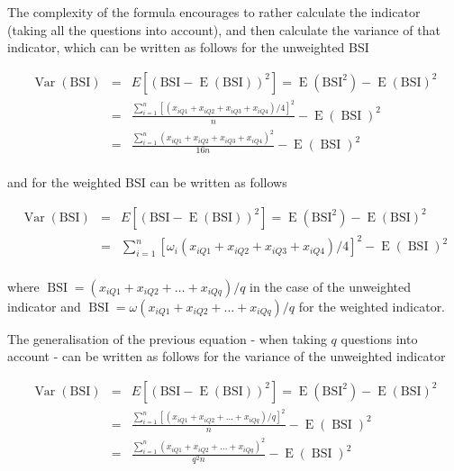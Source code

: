\documentclass[12pt,a4paper,oneside]{book}
\DeclareMathOperator{\Var}{Var}
\DeclareMathOperator{\E}{E}
\DeclareMathOperator{\BSI}{BSI}
\begin{document}
The complexity of the formula encourages to rather calculate the indicator (taking all the questions into account), and then calculate the variance of that indicator, which can be written as follows for the unweighted BSI

\begin{eqnarray}
         \Var(\text{BSI}) &=& E \left[ \left(\text{BSI}-\E(\text{BSI}) \right)^2 \right] =  \E \left( \text{BSI}^2\right) - \E \left( \text{BSI}\right)^2 \\ 
         &=&  \frac{\sum^n_{i=1}[(x_{iQ1} + x_{iQ2} + x_{iQ3} + x_{iQ4})/4]^2}{n} - \E (\BSI)^2 \\
        &=&  \frac{\sum^n_{i=1}(x_{iQ1} + x_{iQ2} + x_{iQ3} + x_{iQ4})^2}{16n} - \E (\BSI)^2 \\ \nonumber
\end{eqnarray}

and for the weighted BSI can be written as follows

\begin{eqnarray}
         \Var(\text{BSI}) &=& E \left[ \left(\text{BSI}-\E(\text{BSI}) \right)^2 \right] =  \E \left( \text{BSI}^2\right) - \E \left( \text{BSI}\right)^2 \\ 
         &=&  \sum^n_{i=1} \left[\omega_i (x_{iQ1} + x_{iQ2} + x_{iQ3} + x_{iQ4})/4 \right]^2 - \E (\BSI)^2 \\ \nonumber
\end{eqnarray}

where $\BSI = \left(x_{i Q1} + x_{i Q2} + \ldots + x_{i Qq} \right) / q $ in the case of the unweighted indicator and $\BSI = \omega \left(x_{i Q1} + x_{i Q2} + \ldots + x_{i Qq} \right) / q $ for the weighted indicator.

The generalisation of the previous equation - when taking $q$ questions into account - can be written as follows for the variance of the unweighted indicator

\begin{eqnarray}
         \Var(\text{BSI}) &=& E \left[ \left(\text{BSI}-\E(\text{BSI}) \right)^2 \right] =  \E \left( \text{BSI}^2\right) - \E \left( \text{BSI}\right)^2 \\ 
         &=&  \frac{\sum^n_{i=1}[(x_{iQ1} + x_{iQ2} + \ldots + x_{iQq})/q]^2}{n} - \E (\BSI)^2 \\
        &=&  \frac{\sum^n_{i=1}(x_{iQ1} + x_{iQ2} + \ldots + x_{iQq})^2}{q^2 n} - \E (\BSI)^2 \\ \nonumber
\end{eqnarray}
\end{document}
